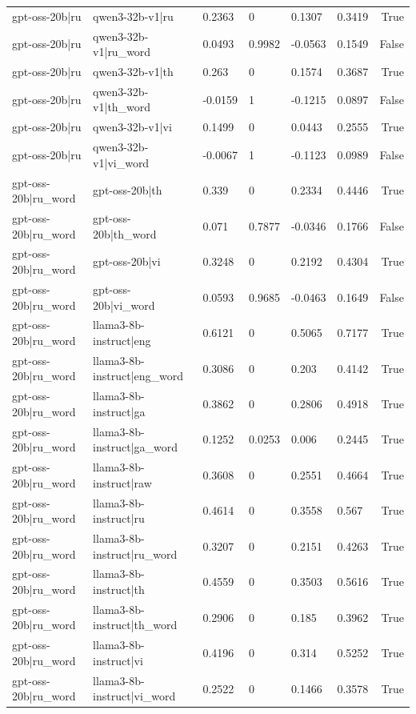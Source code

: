 \begin{table}
\begin{tabular}{llllllr}
gpt-oss-20b|ru & qwen3-32b-v1|ru & 0.2363 & 0 & 0.1307 & 0.3419 & True \\
gpt-oss-20b|ru & qwen3-32b-v1|ru_word & 0.0493 & 0.9982 & -0.0563 & 0.1549 & False \\
gpt-oss-20b|ru & qwen3-32b-v1|th & 0.263 & 0 & 0.1574 & 0.3687 & True \\
gpt-oss-20b|ru & qwen3-32b-v1|th_word & -0.0159 & 1 & -0.1215 & 0.0897 & False \\
gpt-oss-20b|ru & qwen3-32b-v1|vi & 0.1499 & 0 & 0.0443 & 0.2555 & True \\
gpt-oss-20b|ru & qwen3-32b-v1|vi_word & -0.0067 & 1 & -0.1123 & 0.0989 & False \\
gpt-oss-20b|ru_word & gpt-oss-20b|th & 0.339 & 0 & 0.2334 & 0.4446 & True \\
gpt-oss-20b|ru_word & gpt-oss-20b|th_word & 0.071 & 0.7877 & -0.0346 & 0.1766 & False \\
gpt-oss-20b|ru_word & gpt-oss-20b|vi & 0.3248 & 0 & 0.2192 & 0.4304 & True \\
gpt-oss-20b|ru_word & gpt-oss-20b|vi_word & 0.0593 & 0.9685 & -0.0463 & 0.1649 & False \\
gpt-oss-20b|ru_word & llama3-8b-instruct|eng & 0.6121 & 0 & 0.5065 & 0.7177 & True \\
gpt-oss-20b|ru_word & llama3-8b-instruct|eng_word & 0.3086 & 0 & 0.203 & 0.4142 & True \\
gpt-oss-20b|ru_word & llama3-8b-instruct|ga & 0.3862 & 0 & 0.2806 & 0.4918 & True \\
gpt-oss-20b|ru_word & llama3-8b-instruct|ga_word & 0.1252 & 0.0253 & 0.006 & 0.2445 & True \\
gpt-oss-20b|ru_word & llama3-8b-instruct|raw & 0.3608 & 0 & 0.2551 & 0.4664 & True \\
gpt-oss-20b|ru_word & llama3-8b-instruct|ru & 0.4614 & 0 & 0.3558 & 0.567 & True \\
gpt-oss-20b|ru_word & llama3-8b-instruct|ru_word & 0.3207 & 0 & 0.2151 & 0.4263 & True \\
gpt-oss-20b|ru_word & llama3-8b-instruct|th & 0.4559 & 0 & 0.3503 & 0.5616 & True \\
gpt-oss-20b|ru_word & llama3-8b-instruct|th_word & 0.2906 & 0 & 0.185 & 0.3962 & True \\
gpt-oss-20b|ru_word & llama3-8b-instruct|vi & 0.4196 & 0 & 0.314 & 0.5252 & True \\
gpt-oss-20b|ru_word & llama3-8b-instruct|vi_word & 0.2522 & 0 & 0.1466 & 0.3578 & True \\

\end{tabular}
\end{table}
